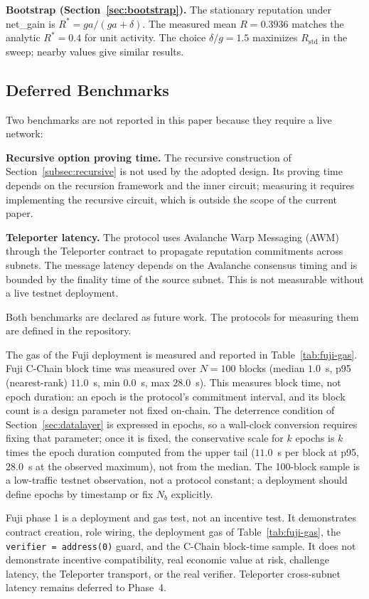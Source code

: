 \documentclass[11pt,a4paper]{article}
\numberwithin{equation}{section}
\numberwithin{table}{section}
\begin{document}
\textbf{Bootstrap (Section~\ref{sec:bootstrap}).} The stationary reputation under net\_gain is $R^* = ga/(ga + \delta)$. The measured mean $R = 0.3936$ matches the analytic $R^* = 0.4$ for unit activity. The choice $\delta/g = 1.5$ maximizes $R_{\mathrm{std}}$ in the sweep; nearby values give similar results.

\subsection{Deferred Benchmarks}
\label{subsec:deferred}
Two benchmarks are not reported in this paper because they require a live network:

\textbf{Recursive option proving time.} The recursive construction of Section~\ref{subsec:recursive} is not used by the adopted design. Its proving time depends on the recursion framework and the inner circuit; measuring it requires implementing the recursive circuit, which is outside the scope of the current paper.

\textbf{Teleporter latency.} The protocol uses Avalanche Warp Messaging (AWM) through the Teleporter contract to propagate reputation commitments across subnets. The message latency depends on the Avalanche consensus timing and is bounded by the finality time of the source subnet. This is not measurable without a live testnet deployment.

Both benchmarks are declared as future work. The protocols for measuring them are defined in the repository.

The gas of the Fuji deployment is measured and reported in Table~\ref{tab:fuji-gas}. Fuji C-Chain block time was measured over $N=100$ blocks (median $1.0$~s, p95 (nearest-rank) $11.0$~s, min $0.0$~s, max $28.0$~s). This measures block time, not epoch duration: an epoch is the protocol's commitment interval, and its block count is a design parameter not fixed on-chain. The deterrence condition of Section~\ref{sec:datalayer} is expressed in epochs, so a wall-clock conversion requires fixing that parameter; once it is fixed, the conservative scale for $k$ epochs is $k$ times the epoch duration computed from the upper tail ($11.0$~s per block at p95, $28.0$~s at the observed maximum), not from the median. The 100-block sample is a low-traffic testnet observation, not a protocol constant; a deployment should define epochs by timestamp or fix $N_b$ explicitly.

Fuji phase 1 is a deployment and gas test, not an incentive test. It demonstrates contract creation, role wiring, the deployment gas of Table~\ref{tab:fuji-gas}, the \texttt{verifier = address(0)} guard, and the C-Chain block-time sample. It does not demonstrate incentive compatibility, real economic value at risk, challenge latency, the Teleporter transport, or the real verifier. Teleporter cross-subnet latency remains deferred to Phase~4.
\end{document}
